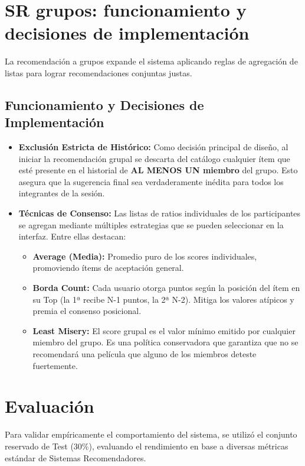 \documentclass[12pt]{scrartcl}
\begin{document}
\section{SR grupos: funcionamiento y decisiones de implementación}
La recomendación a grupos expande el sistema aplicando reglas de agregación de listas para lograr recomendaciones conjuntas justas.

\subsection{Funcionamiento y Decisiones de Implementación}
\begin{itemize}
    \item \textbf{Exclusión Estricta de Histórico:} Como decisión principal de diseño, al iniciar la recomendación grupal se descarta del catálogo cualquier ítem que esté presente en el historial de \textbf{AL MENOS UN miembro} del grupo. Esto asegura que la sugerencia final sea verdaderamente inédita para todos los integrantes de la sesión.
    \item \textbf{Técnicas de Consenso:} Las listas de ratios individuales de los participantes se agregan mediante múltiples estrategias que se pueden seleccionar en la interfaz. Entre ellas destacan:
    \begin{itemize}
        \item \textbf{Average (Media):} Promedio puro de los scores individuales, promoviendo ítems de aceptación general.
        \item \textbf{Borda Count:} Cada usuario otorga puntos según la posición del ítem en su Top (la 1ª recibe N-1 puntos, la 2ª N-2). Mitiga los valores atípicos y premia el consenso posicional.
        \item \textbf{Least Misery:} El score grupal es el valor mínimo emitido por cualquier miembro del grupo. Es una política conservadora que garantiza que no se recomendará una película que alguno de los miembros deteste fuertemente.
    \end{itemize}
\end{itemize}

\section{Evaluación}
Para validar empíricamente el comportamiento del sistema, se utilizó el conjunto reservado de Test (30\%), evaluando el rendimiento en base a diversas métricas estándar de Sistemas Recomendadores.
\end{document}
